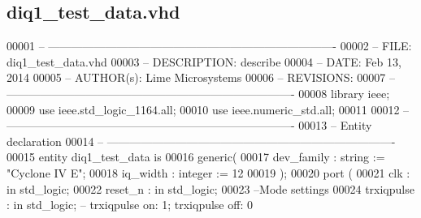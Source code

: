 \subsection{diq1\+\_\+test\+\_\+data.\+vhd}
\label{diq1__test__data_8vhd_source}

\begin{DoxyCode}
00001 \textcolor{keyword}{-- ---------------------------------------------------------------------------- }
00002 \textcolor{keyword}{-- FILE:    diq1\_test\_data.vhd}
00003 \textcolor{keyword}{-- DESCRIPTION: describe}
00004 \textcolor{keyword}{-- DATE:    Feb 13, 2014}
00005 \textcolor{keyword}{-- AUTHOR(s):   Lime Microsystems}
00006 \textcolor{keyword}{-- REVISIONS:}
00007 \textcolor{keyword}{-- ---------------------------------------------------------------------------- }
00008 \textcolor{vhdlkeyword}{library }\textcolor{keywordflow}{ieee};
00009 \textcolor{vhdlkeyword}{use }ieee.std\_logic\_1164.\textcolor{keywordflow}{all};
00010 \textcolor{vhdlkeyword}{use }ieee.numeric\_std.\textcolor{keywordflow}{all};
00011 
00012 \textcolor{keyword}{-- ----------------------------------------------------------------------------}
00013 \textcolor{keyword}{-- Entity declaration}
00014 \textcolor{keyword}{-- ----------------------------------------------------------------------------}
00015 \textcolor{keywordflow}{entity }diq1_test_data \textcolor{keywordflow}{is}
00016    \textcolor{keywordflow}{generic}\textcolor{vhdlchar}{(} 
00017       \textcolor{vhdlchar}{dev_family}    \textcolor{vhdlchar}{:} \textcolor{comment}{string} \textcolor{vhdlchar}{:=} \textcolor{keyword}{"Cyclone IV E"};
00018       \textcolor{vhdlchar}{iq_width}      \textcolor{vhdlchar}{:} \textcolor{comment}{integer} \textcolor{vhdlchar}{:=} \textcolor{vhdllogic}{}\textcolor{vhdllogic}{12}
00019    \textcolor{vhdlchar}{)};
00020    \textcolor{keywordflow}{port} \textcolor{vhdlchar}{(}
00021       \textcolor{vhdlchar}{clk}         \textcolor{vhdlchar}{:} \textcolor{keywordflow}{in} \textcolor{comment}{std\_logic};
00022       \textcolor{vhdlchar}{reset_n}     \textcolor{vhdlchar}{:} \textcolor{keywordflow}{in} \textcolor{comment}{std\_logic};
00023 \textcolor{keyword}{      --Mode settings}
00024       \textcolor{vhdlchar}{trxiqpulse}    \textcolor{vhdlchar}{:} \textcolor{keywordflow}{in} \textcolor{comment}{std\_logic};\textcolor{keyword}{ -- trxiqpulse on: 1; trxiqpulse off: 0}

\end{DoxyCode}
